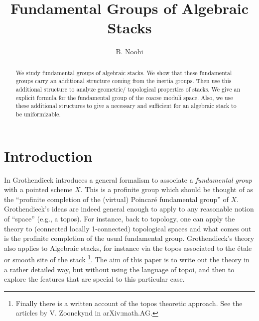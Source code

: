 \documentclass{amsart}
\theoremstyle{definition}
\theoremstyle{remark}
\theoremstyle{remark}
\begin{document}
\title[Fundamental Groups of Algebraic Stacks]{Fundamental Groups of Algebraic Stacks}%
\author{B. Noohi}%


\begin{abstract}
We study fundamental groups of algebraic stacks. We show that
these fundamental groups carry an additional structure coming from
the inertia groups. Then use this additional structure to analyze
geometric/ topological properties of stacks. We give an explicit
formula for the fundamental group of the coarse moduli space.
Also, we use these additional structures to give a necessary and
sufficient for an algebraic stack to be uniformizable.

\end{abstract}
\maketitle
\section{Introduction}



In \cite{SGA1} Grothendieck introduces a general formalism to
associate a {\em fundamental group} with a pointed scheme $X$.
This is a profinite group which should be thought of as the
``profinite completion of the (virtual) Poincar\'{e} fundamental
group'' of $X$. Grothendieck's ideas are indeed general enough to
apply to  any reasonable notion of ``space'' (e.g., a topos). For
instance, back to topology, one can apply the theory to (connected
locally 1-connected) topological spaces and what comes out is the
profinite completion of the usual fundamental group.
Grothendieck's theory also applies to Algebraic stacks, for
instance via the topos associated to the \'{e}tale or smooth site
of the stack \footnote{Finally there is a written account of the
topos theoretic approach. See the articles by V. Zoonekynd in
arXiv:math.AG.}.  The aim of this paper is to write out the theory
in a rather detailed way, but without using the language of topoi,
and then to explore the features that are special to this
particular case.
\end{document}
